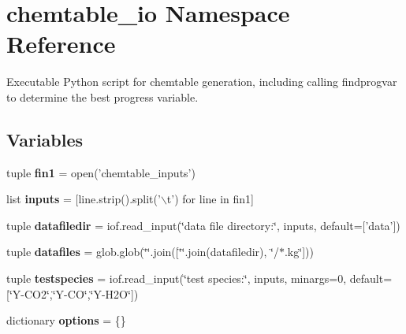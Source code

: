 \hypertarget{namespacechemtable__io}{
\section{chemtable\_\-io Namespace Reference}
\label{dc/dad/namespacechemtable__io}
}


Executable Python script for chemtable generation, including calling findprogvar to determine the best progress variable.  


\subsection*{Variables}
\begin{DoxyCompactItemize}
\item 
\hypertarget{namespacechemtable__io_a214567a7d60f61727b590c79db510a87}{
tuple {\bfseries fin1} = open('chemtable\_\-inputs')}
\label{dc/dad/namespacechemtable__io_a214567a7d60f61727b590c79db510a87}

\item 
\hypertarget{namespacechemtable__io_a8ca5e5bfec786b71c5ee3559dffe2752}{
list {\bfseries inputs} = \mbox{[}line.strip().split('$\backslash$t') for line in fin1\mbox{]}}
\label{dc/dad/namespacechemtable__io_a8ca5e5bfec786b71c5ee3559dffe2752}

\item 
\hypertarget{namespacechemtable__io_aebf013d138d62646abe4efe970a5f0d8}{
tuple {\bfseries datafiledir} = iof.read\_\-input(\char`\"{}data file directory:\char`\"{}, inputs, default=\mbox{[}'data'\mbox{]})}
\label{dc/dad/namespacechemtable__io_aebf013d138d62646abe4efe970a5f0d8}

\item 
\hypertarget{namespacechemtable__io_a9a54c24292e5f373096ead6dcc53b8e6}{
tuple {\bfseries datafiles} = glob.glob(\char`\"{}\char`\"{}.join(\mbox{[}\char`\"{}\char`\"{}.join(datafiledir), \char`\"{}/$\ast$.kg\char`\"{}\mbox{]}))}
\label{dc/dad/namespacechemtable__io_a9a54c24292e5f373096ead6dcc53b8e6}

\item 
\hypertarget{namespacechemtable__io_a8a3a48b139f89f140ff129a19095fb54}{
tuple {\bfseries testspecies} = iof.read\_\-input(\char`\"{}test species:\char`\"{}, inputs, minargs=0, default=\mbox{[}\char`\"{}Y-\/CO2\char`\"{},\char`\"{}Y-\/CO\char`\"{},\char`\"{}Y-\/H2O\char`\"{}\mbox{]})}
\label{dc/dad/namespacechemtable__io_a8a3a48b139f89f140ff129a19095fb54}

\item 
\hypertarget{namespacechemtable__io_a9225d452d2efd4ea64e851408eb0651e}{
dictionary {\bfseries options} = \{\}}
\label{dc/dad/namespacechemtable__io_a9225d452d2efd4ea64e851408eb0651e}


\end{DoxyCompactItemize}
